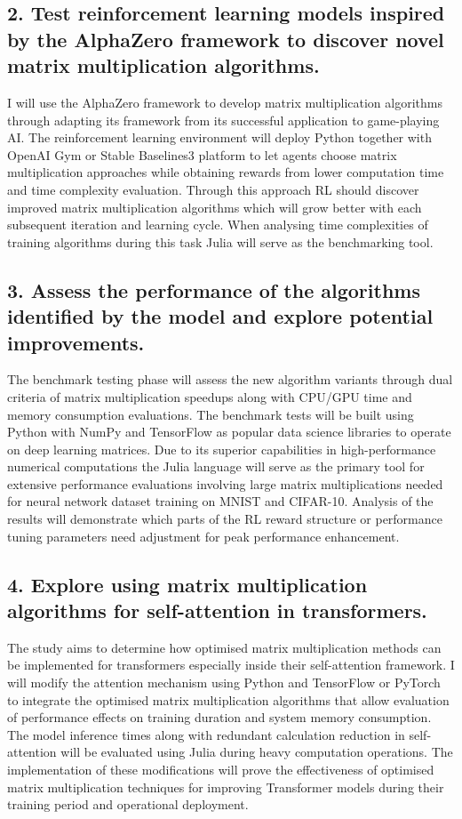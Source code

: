 \documentclass{article}
\begin{document}
\subsection*{2. Test reinforcement learning models inspired by the AlphaZero framework to discover novel matrix multiplication algorithms.}
I will use the AlphaZero framework to develop matrix multiplication algorithms through adapting its framework from its successful application to game-playing AI. The reinforcement learning environment will deploy Python together with OpenAI Gym or Stable Baselines3 platform to let agents choose matrix multiplication approaches while obtaining rewards from lower computation time and time complexity evaluation. Through this approach RL should discover improved matrix multiplication algorithms which will grow better with each subsequent iteration and learning cycle. When analysing time complexities of training algorithms during this task Julia will serve as the benchmarking tool.

\subsection*{3. Assess the performance of the algorithms identified by the model and explore potential improvements.}
The benchmark testing phase will assess the new algorithm variants through dual criteria of matrix multiplication speedups along with CPU/GPU time and memory consumption evaluations. The benchmark tests will be built using Python with NumPy and TensorFlow as popular data science libraries to operate on deep learning matrices. Due to its superior capabilities in high-performance numerical computations the Julia language will serve as the primary tool for extensive performance evaluations involving large matrix multiplications needed for neural network dataset training on MNIST and CIFAR-10. Analysis of the results will demonstrate which parts of the RL reward structure or performance tuning parameters need adjustment for peak performance enhancement.

\subsection*{4. Explore using matrix multiplication algorithms for self-attention in transformers.}
The study aims to determine how optimised matrix multiplication methods can be implemented for transformers especially inside their self-attention framework. I will modify the attention mechanism using Python and TensorFlow or PyTorch to integrate the optimised matrix multiplication algorithms that allow evaluation of performance effects on training duration and system memory consumption. The model inference times along with redundant calculation reduction in self-attention will be evaluated using Julia during heavy computation operations. The implementation of these modifications will prove the effectiveness of optimised matrix multiplication techniques for improving Transformer models during their training period and operational deployment.
\end{document}
